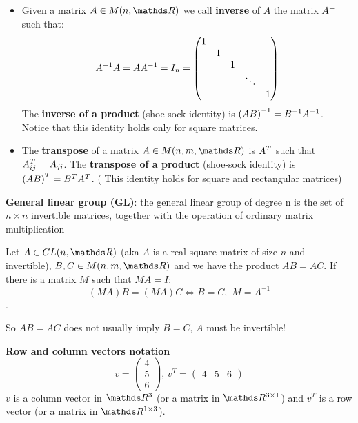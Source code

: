 \documentclass[computational_mathematics.tex]{subfiles}
\begin{document}
\begin{itemize}
     \item Given a matrix $A \in M(n, \R)$ we call \textbf{inverse} of $A$ the matrix ${A}^{-1}$ such that:
         $${A}^{-1} A = A {A}^{-1} = I_{n} =
         \begin{pmatrix}
                1\\
                & 1\\
                & & 1\\
                & & & \ddots\\
                & & & & 1
         \end{pmatrix}$$
         The \textbf{inverse of a product} (shoe-sock identity) is ${(A B)}^{-1} = {B}^{-1} {A}^{-1}$. Notice that this identity holds only for square matrices.

     \item The \textbf{transpose} of a matrix $A \in M(n, m, \R)$ is ${A}^{T}$ such that ${A}^{T}_{ij} = A_{ji}$. The \textbf{transpose of a product} (shoe-sock identity) is ${(A B)}^{T} = {B}^{T} {A}^{T}$. ( This identity holds for square and rectangular matrices)

\end{itemize} 

\begin{definition}
  \textbf{General linear group (GL)}: the general linear group of degree n is the set of $n\times n$ invertible matrices, together with the operation of ordinary matrix multiplication
\end{definition}

\begin{proposition}
  Let $A \in GL(n, \R)$ (aka $A$ is a real square matrix of size $n$ and invertible), $B, C \in M(n, m, \R)$ and we have the product $AB = AC$. If there is a matrix $M$ such that $MA = I$: 
  $$(MA)B = (MA)C \Longleftrightarrow B=C, \,\, M = A^{-1}$$.
\end{proposition}
\noindent So $AB = AC$ does not usually imply $B = C$, $A$ must be invertible!\\

\begin{myframe}{\bf Row and column vectors notation}
        $$v =   \begin{pmatrix}
                    4\\
                    5\\
                    6
                \end{pmatrix},\,
          v^T = \begin{pmatrix}
                    4 & 5 & 6
          \end{pmatrix}$$
          $v$ is a column vector in $\R^3$ (or a matrix in $\R^{3 \times 1}$) and $v^T$ is a row vector (or a matrix in $\R^{1\times 3}$).
\end{myframe}
\end{document}
